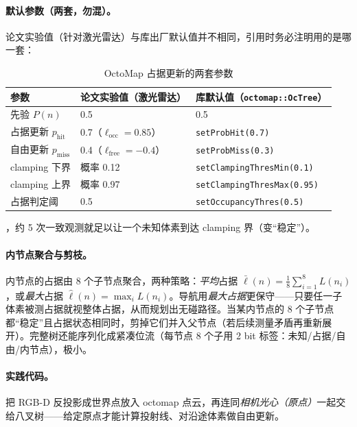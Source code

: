 \paragraph{默认参数（两套，勿混）。}
论文实验值（针对激光雷达）与库出厂默认值并不相同，引用时务必注明用的是哪一套\cite{hornung2013octomap}：

\begin{table}[H]\centering\small
\caption{OctoMap 占据更新的两套参数}
\label{tab:dense-octo-params}
\begin{tabular}{lll}
\toprule
参数 & 论文实验值（激光雷达） & 库默认值（\texttt{octomap::OcTree}） \\
\midrule
先验 $P(n)$ & 0.5 & 0.5 \\
占据更新 $p_{\mathrm{hit}}$ & 0.7（$\ell_{\mathrm{occ}}=0.85$） & \texttt{setProbHit(0.7)} \\
自由更新 $p_{\mathrm{miss}}$ & 0.4（$\ell_{\mathrm{free}}=-0.4$） & \texttt{setProbMiss(0.3)} \\
clamping 下界 & 概率 0.12 & \texttt{setClampingThresMin(0.1)} \\
clamping 上界 & 概率 0.97 & \texttt{setClampingThresMax(0.95)} \\
占据判定阈 & 0.5 & \texttt{setOccupancyThres(0.5)} \\
\bottomrule
\end{tabular}
\end{table}

，约 5 次一致观测就足以让一个未知体素到达 clamping 界（变“稳定”）。

\paragraph{内节点聚合与剪枝。}
内节点的占据由 8 个子节点聚合，两种策略：\emph{平均}占据 $\bar\ell(n)=\frac18\sum_{i=1}^{8}L(n_i)$，或\emph{最大}占据 $\hat\ell(n)=\max_i L(n_i)$。导航用\emph{最大占据}更保守——只要任一子体素被测占据就视整体占据，从而规划出无碰路径。当某内节点的 8 个子节点都“稳定”且占据状态相同时，剪掉它们并入父节点（若后续测量矛盾再重新展开）。完整树还能序列化成紧凑位流（每节点 8 个子用 2 bit 标签：未知/占据/自由/内节点），极小。

\paragraph{实践代码。}
把 RGB-D 反投影成世界点放入 octomap 点云，再连同\emph{相机光心（原点）}一起交给八叉树——给定原点才能计算投射线、对沿途体素做自由更新。

